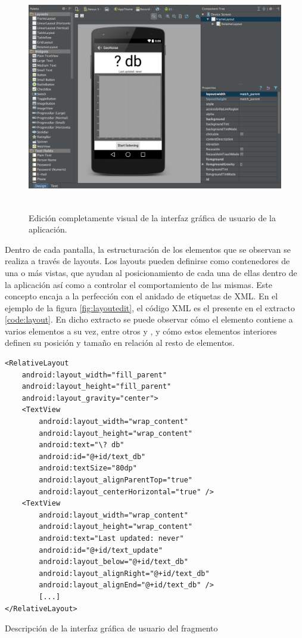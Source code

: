  \begin{figure}[h] \centering
    \includegraphics[height=10cm]{graphs/layoutvisual.png} \caption{Edición completamente visual de la interfaz gráfica de usuario de la aplicación.}\label{fig:layoutvisual}
\end{figure}

Dentro de cada pantalla, la estructuración de los elementos que se observan se realiza a través de layouts. Los layouts pueden definirse como contenedores de una o más vistas, que ayudan al posicionamiento de cada una de ellas dentro de la aplicación así como a controlar el comportamiento de las mismas. Este concepto encaja a la perfección con el anidado de etiquetas de XML. En el ejemplo de la figura \ref{fig:layoutedit}, el código XML es el presente en el extracto \ref{code:layout}. En dicho extracto se puede observar cómo el elemento  contiene a varios elementos a su vez, entre otros  y , y cómo estos elementos interiores definen su posición y tamaño en relación al resto de elementos. 

\begin{listing}[h] 
\begin{verbatim}
<RelativeLayout
    android:layout_width="fill_parent"
    android:layout_height="fill_parent"
    android:layout_gravity="center">
    <TextView
        android:layout_width="wrap_content"
        android:layout_height="wrap_content"
        android:text="\? db"
        android:id="@+id/text_db"
        android:textSize="80dp"
        android:layout_alignParentTop="true"
        android:layout_centerHorizontal="true" />
    <TextView
        android:layout_width="wrap_content"
        android:layout_height="wrap_content"
        android:text="Last updated: never"
        android:id="@+id/text_update"
        android:layout_below="@+id/text_db"
        android:layout_alignRight="@+id/text_db"
        android:layout_alignEnd="@+id/text_db" />
        [...]
</RelativeLayout>
\end{verbatim}
\caption{Descripción de la interfaz gráfica de usuario del fragmento }
\label{code:layout}
\end{listing}

